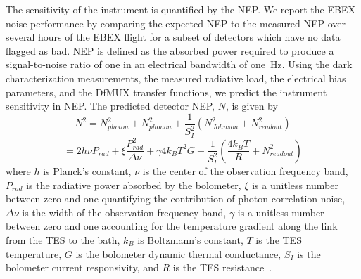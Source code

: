 The sensitivity of the instrument is quantified by the \ac{NEP}. 
We report the \ac{EBEX} noise performance by comparing the expected \ac{NEP} to the measured \ac{NEP} over several hours of the \ac{EBEX} flight for a subset of detectors which have no data flagged as bad. 
\ac{NEP} is defined as the absorbed power required to produce a signal-to-noise ratio of one in an electrical bandwidth of one~Hz. 
Using the dark characterization measurements, the measured radiative load, the electrical bias parameters, and the \ac{DfMUX} transfer functions, we predict the instrument sensitivity in \ac{NEP}. 
The predicted detector \ac{NEP}, $N$, is given by 
\begin{equation}
N^{2} = N_{photon}^2 + N_{phonon}^2 + \frac{1}{S_I^2} ( N_{Johnson}^2 + N_{readout}^2 )
\end{equation}
\begin{equation}
= 2h\nu P_{rad} + \xi \frac{P_{rad}^2}{\Delta \nu} + \gamma 4k_{B} T^2 G + \frac{1}{S_I^2} (\frac{4k_BT}{R} + N_{readout}^2 )
\end{equation}
where $h$ is Planck's constant, $\nu$ is the center of the observation frequency band, $P_{rad}$ is the radiative power absorbed by the bolometer, $\xi$ is a unitless number between zero and one quantifying the contribution of photon correlation noise, $\Delta \nu$ is the width of the observation frequency band, $\gamma$ is a unitless number between zero and one accounting for the temperature gradient along the link from the \ac{TES} to the bath, $k_{B}$ is Boltzmann's constant, $T$ is the \ac{TES} temperature, $G$ is the bolometer dynamic thermal conductance, $S_{I}$ is the bolometer current responsivity, and $R$ is the \ac{TES} resistance~\citep{Mather1982a}. 
%
%
%
